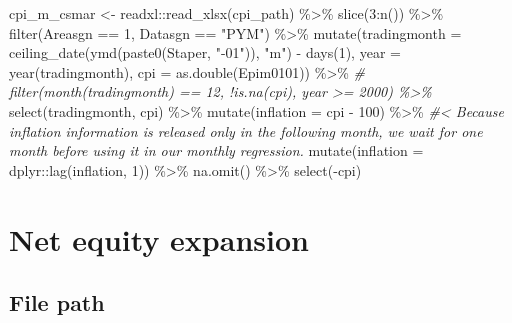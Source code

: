 \documentclass[
]{article}
\newenvironment{Shaded}{\begin{snugshade}}{\end{snugshade}}
\newcommand{\AttributeTok}[1]{\textcolor[rgb]{0.77,0.63,0.00}{#1}}
\newcommand{\CommentTok}[1]{\textcolor[rgb]{0.56,0.35,0.01}{\textit{#1}}}
\newcommand{\DecValTok}[1]{\textcolor[rgb]{0.00,0.00,0.81}{#1}}
\newcommand{\FunctionTok}[1]{\textcolor[rgb]{0.00,0.00,0.00}{#1}}
\newcommand{\NormalTok}[1]{#1}
\newcommand{\OtherTok}[1]{\textcolor[rgb]{0.56,0.35,0.01}{#1}}
\newcommand{\SpecialCharTok}[1]{\textcolor[rgb]{0.00,0.00,0.00}{#1}}
\newcommand{\StringTok}[1]{\textcolor[rgb]{0.31,0.60,0.02}{#1}}
\begin{document}
\begin{Shaded}
\begin{Highlighting}[]
\NormalTok{cpi\_m\_csmar }\OtherTok{\textless{}{-}}\NormalTok{ readxl}\SpecialCharTok{::}\FunctionTok{read\_xlsx}\NormalTok{(cpi\_path) }\SpecialCharTok{\%\textgreater{}\%} 
  \FunctionTok{slice}\NormalTok{(}\DecValTok{3}\SpecialCharTok{:}\FunctionTok{n}\NormalTok{()) }\SpecialCharTok{\%\textgreater{}\%} 
  \FunctionTok{filter}\NormalTok{(Areasgn }\SpecialCharTok{==} \DecValTok{1}\NormalTok{, Datasgn }\SpecialCharTok{==} \StringTok{"PYM"}\NormalTok{) }\SpecialCharTok{\%\textgreater{}\%} 
  \FunctionTok{mutate}\NormalTok{(}\AttributeTok{tradingmonth =} \FunctionTok{ceiling\_date}\NormalTok{(}\FunctionTok{ymd}\NormalTok{(}\FunctionTok{paste0}\NormalTok{(Staper, }\StringTok{"{-}01"}\NormalTok{)), }\StringTok{"m"}\NormalTok{) }\SpecialCharTok{{-}} \FunctionTok{days}\NormalTok{(}\DecValTok{1}\NormalTok{), }
         \AttributeTok{year =} \FunctionTok{year}\NormalTok{(tradingmonth),}
         \AttributeTok{cpi =} \FunctionTok{as.double}\NormalTok{(Epim0101)) }\SpecialCharTok{\%\textgreater{}\%} 
  \CommentTok{\# filter(month(tradingmonth) == 12, !is.na(cpi), year \textgreater{}= 2000) \%\textgreater{}\% }
  \FunctionTok{select}\NormalTok{(tradingmonth, cpi) }\SpecialCharTok{\%\textgreater{}\%} 
  \FunctionTok{mutate}\NormalTok{(}\AttributeTok{inflation =}\NormalTok{ cpi }\SpecialCharTok{{-}} \DecValTok{100}\NormalTok{) }\SpecialCharTok{\%\textgreater{}\%} 
  \CommentTok{\#\textless{} Because inflation information is released only in the following month, we wait for one month before using it in our monthly regression.}
  \FunctionTok{mutate}\NormalTok{(}\AttributeTok{inflation =}\NormalTok{ dplyr}\SpecialCharTok{::}\FunctionTok{lag}\NormalTok{(inflation, }\DecValTok{1}\NormalTok{)) }\SpecialCharTok{\%\textgreater{}\%}
  \FunctionTok{na.omit}\NormalTok{() }\SpecialCharTok{\%\textgreater{}\%} 
  \FunctionTok{select}\NormalTok{(}\SpecialCharTok{{-}}\NormalTok{cpi)}
\end{Highlighting}
\end{Shaded}

\hypertarget{net-equity-expansion}{%
\section{Net equity expansion}\label{net-equity-expansion}}

\hypertarget{file-path-4}{%
\subsection{File path}\label{file-path-4}}
\end{document}
